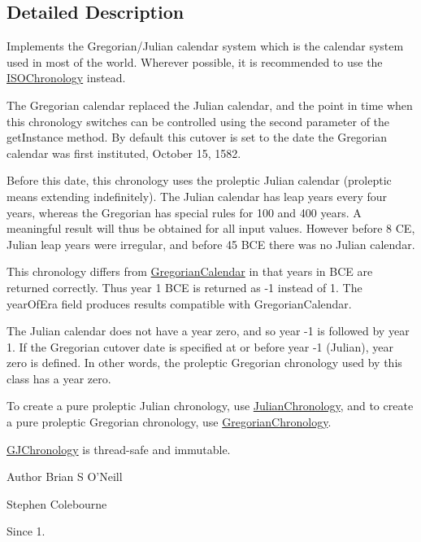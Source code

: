 \subsection{Detailed Description}
Implements the Gregorian/\-Julian calendar system which is the calendar system used in most of the world. Wherever possible, it is recommended to use the \hyperlink{classorg_1_1joda_1_1time_1_1chrono_1_1_i_s_o_chronology}{I\-S\-O\-Chronology} instead. 

The Gregorian calendar replaced the Julian calendar, and the point in time when this chronology switches can be controlled using the second parameter of the get\-Instance method. By default this cutover is set to the date the Gregorian calendar was first instituted, October 15, 1582. 

Before this date, this chronology uses the proleptic Julian calendar (proleptic means extending indefinitely). The Julian calendar has leap years every four years, whereas the Gregorian has special rules for 100 and 400 years. A meaningful result will thus be obtained for all input values. However before 8 C\-E, Julian leap years were irregular, and before 45 B\-C\-E there was no Julian calendar. 

This chronology differs from \hyperlink{}{Gregorian\-Calendar} in that years in B\-C\-E are returned correctly. Thus year 1 B\-C\-E is returned as -\/1 instead of 1. The year\-Of\-Era field produces results compatible with Gregorian\-Calendar. 

The Julian calendar does not have a year zero, and so year -\/1 is followed by year 1. If the Gregorian cutover date is specified at or before year -\/1 (Julian), year zero is defined. In other words, the proleptic Gregorian chronology used by this class has a year zero. 

To create a pure proleptic Julian chronology, use \hyperlink{classorg_1_1joda_1_1time_1_1chrono_1_1_julian_chronology}{Julian\-Chronology}, and to create a pure proleptic Gregorian chronology, use \hyperlink{classorg_1_1joda_1_1time_1_1chrono_1_1_gregorian_chronology}{Gregorian\-Chronology}. 

\hyperlink{classorg_1_1joda_1_1time_1_1chrono_1_1_g_j_chronology}{G\-J\-Chronology} is thread-\/safe and immutable.

\begin{DoxyAuthor}{Author}
Brian S O'Neill 

Stephen Colebourne 
\end{DoxyAuthor}
\begin{DoxySince}{Since}
1. 
\end{DoxySince}


